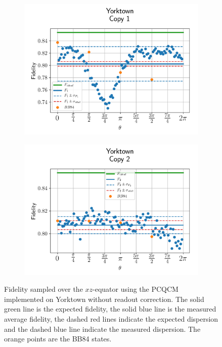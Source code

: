   
  \begin{figure}[htbp]
    \centering
    \begin{subfigure}{.5\textwidth}
      \centering
      \includegraphics[width=\textwidth]{Figures/PhaseCovariant/IBM/OnlyEquator/results_ibmqx2_copy1.png}
      \label{fig:pc_uncorrected_yorktown_equator_1}
    \end{subfigure}%
    \begin{subfigure}{.5\textwidth}
      \centering
      \includegraphics[width=\textwidth]{Figures/PhaseCovariant/IBM/OnlyEquator/results_ibmqx2_copy2.png}
      \label{fig:pc_uncorrected_yorktown_equator_2}
    \end{subfigure}
    \vspace{-0.5cm}
    \caption{Fidelity sampled over the $xz$-equator using the PCQCM implemented on Yorktown without readout correction. The solid green line is the expected fidelity, the solid blue line is the measured average fidelity, the dashed red lines indicate the expected dispersion and the dashed blue line indicate the measured dispersion. The orange points are the BB84 states.}
    \label{fig:pc_uncorrected_yorktown_equator}
  \end{figure}


